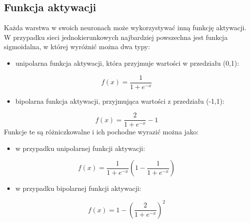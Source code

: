 \documentclass[12pt,twoside]{article}
\begin{document}
\subsection{Funkcja aktywacji}
Każda warstwa w swoich neuronach może wykorzystywać inną funkcję aktywacji.
W przypadku sieci jednokierunkowych najbardziej powszechna jest funkcja sigmoidalna, w której wyróżnić można dwa typy:
\begin{itemize}
	\item unipolarna funkcja aktywacji, która przyjmuje wartości w przedziału (0,1):
\end{itemize}
\begin{equation}
	f(x) = \frac{1}{1+e^{-x}}
	\label{Eq:unipolar_sigmoid}
\end{equation}
\begin{itemize}[resume]
	\item bipolarna funkcja aktywacji, przyjmująca wartości z przedziału (-1,1):
\end{itemize}
\begin{equation}
	f(x) = \frac{2}{1+e^{-x}} - 1
	\label{Eq:bipolar_sigmoid}
\end{equation}
Funkcje te są różniczkowalne i ich pochodne wyrazić można jako:
\begin{itemize}
	\item w przypadku unipolarnej funkcji aktywacji:
\end{itemize}
\begin{equation}
	f(x) = \frac{1}{1+e^{-x}}(1-\frac{1}{1+e^{-x}})
	\label{Eq:unipolar_sigmoid_pochodna}
\end{equation}
\begin{itemize}[resume]
	\item w przypadku bipolarnej funkcji aktywacji:
\end{itemize}
\begin{equation}
	f(x) = 1 - (\frac{2}{1+e^{-x}})^2
	\label{Eq:bipolar_sigmoid_pochodna}
\end{equation}
\newpage
\end{document}
